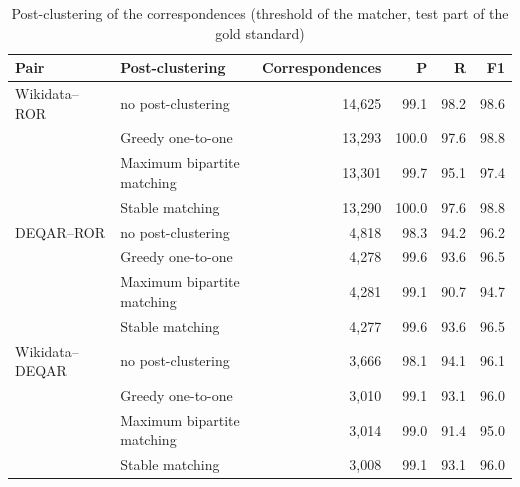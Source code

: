 \begin{table}[t]
\caption{Post-clustering of the correspondences (threshold of the matcher, test part of the gold standard)}\label{tab:post}
\scriptsize
\setlength{\tabcolsep}{4pt}
\begin{tabular}{llrrrr}
\toprule
Pair & Post-clustering & Correspondences & P & R & F1\\
\midrule
Wikidata--ROR & no post-clustering & 14{,}625 & 99.1 & 98.2 & 98.6\\
 & Greedy one-to-one & 13{,}293 & 100.0 & 97.6 & 98.8\\
 & Maximum bipartite matching & 13{,}301 & 99.7 & 95.1 & 97.4\\
 & Stable matching & 13{,}290 & 100.0 & 97.6 & 98.8\\
DEQAR--ROR & no post-clustering & 4{,}818 & 98.3 & 94.2 & 96.2\\
 & Greedy one-to-one & 4{,}278 & 99.6 & 93.6 & 96.5\\
 & Maximum bipartite matching & 4{,}281 & 99.1 & 90.7 & 94.7\\
 & Stable matching & 4{,}277 & 99.6 & 93.6 & 96.5\\
Wikidata--DEQAR & no post-clustering & 3{,}666 & 98.1 & 94.1 & 96.1\\
 & Greedy one-to-one & 3{,}010 & 99.1 & 93.1 & 96.0\\
 & Maximum bipartite matching & 3{,}014 & 99.0 & 91.4 & 95.0\\
 & Stable matching & 3{,}008 & 99.1 & 93.1 & 96.0\\
\bottomrule
\end{tabular}
\end{table}

